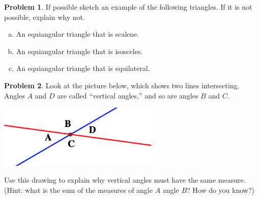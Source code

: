 \documentclass[12pt, reqno]{amsart}
\theoremstyle{remark}
\theoremstyle{definition}
\newtheorem{problem}{Problem}
\numberwithin{equation}{section}  %
\begin{document}
\bigskip


\begin{problem}
If possible sketch an example of the following triangles.  If it is not possible, explain why not.

\begin{enumerate}[(a)]
\item
An equiangular triangle that is scalene.\\

\item
An equiangular triangle that is isosceles.\\

\item
An equiangular triangle that is equilateral.
\end{enumerate}
\end{problem}



  \bigskip

\begin{problem}
Look at the picture below, which shows two lines intersecting.  Angles $A$ and $D$ are called ``vertical angles,'' and so are angles $B$ and $C$.
\begin{center}
\includegraphics[height=3cm]{vertical}
\end{center}
Use this drawing to explain why vertical angles must have the same measure.  (Hint: what is the sum of the measures of angle $A$  angle $B$?  How do you know?)

\end{problem}


\newpage
\end{document}
